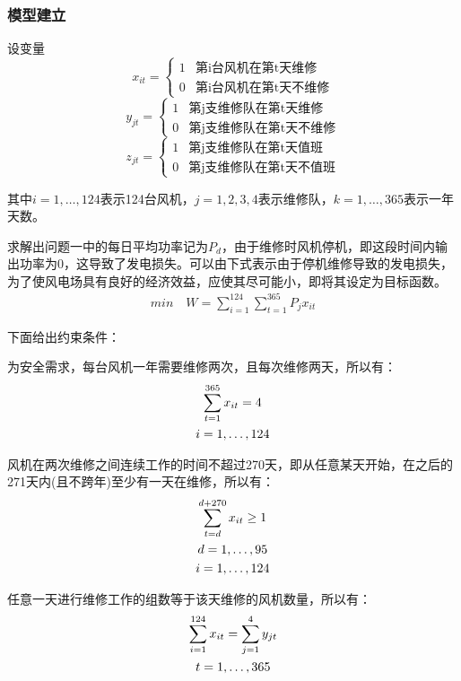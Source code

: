 \documentclass[withoutpreface,bwprint]{cumcmthesis} %
\begin{document}
		\subsubsection{模型建立}
		设变量
		\[
		x_{it} =
		\begin{cases}
			1 &  \text{第i台风机在第t天维修}\\
			0 &  \text{第i台风机在第t天不维修}
		\end{cases}
		\]
		\[
		y_{jt}=
		\begin{cases}
			1 &  \text{第j支维修队在第t天维修} \\
			0 &  \text{第j支维修队在第t天不维修} 
		\end{cases}
		\]
		\[
		z_{jt}=
		\begin{cases}
			1 &  \text{第j支维修队在第t天值班}\\
			0 &  \text{第j支维修队在第t天不值班}
		\end{cases}
		\]\par
		其中$i=1,\dots,124$表示124台风机，$j=1,2,3,4$表示维修队，$k=1,\dots,365$表示一年天数。\par
		求解出问题一中的每日平均功率记为$P_d$，由于维修时风机停机，即这段时间内输出功率为0，这导致了发电损失。可以由下式表示由于停机维修导致的发电损失，为了使风电场具有良好的经济效益，应使其尽可能小，即将其设定为目标函数。
		\begin{gather}
		min\quad W=\sum_{i=1}^{124}\sum_{t=1}^{365}P_{j}x_{it}
		\end{gather}\par
		下面给出约束条件：\par
		为安全需求，每台风机一年需要维修两次，且每次维修两天，所以有：
		\begin{gather}
		\sum_{t=1}^{365}x_{it}=4\\
		i=1,\dots,124\notag
		\end{gather}\par
		风机在两次维修之间连续工作的时间不超过270天，即从任意某天开始，在之后的271天内(且不跨年)至少有一天在维修，所以有：
		\begin{gather}
			\sum_{t=d}^{d+270}x_{it}\geq1\\
			d=1,\dots,95\notag\\
			i=1,\dots,124\notag
		\end{gather}\par
		任意一天进行维修工作的组数等于该天维修的风机数量，所以有：
		\begin{gather}
			\sum_{i=1}^{124}x_{it}=\sum_{j=1}^{4}y_{jt}\\
			t=1,\dots,365\notag
		\end{gather}\par
\end{document}
